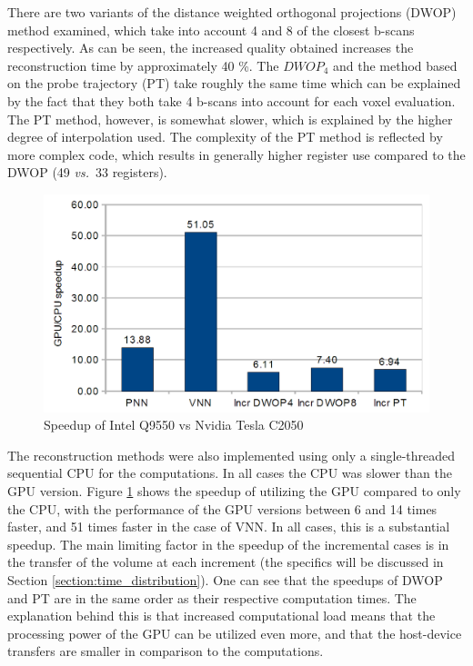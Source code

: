 	There are two variants of the distance weighted orthogonal projections (DWOP) method examined, which take into account 4 and 8 of the closest b-scans respectively. As can be seen, the increased quality obtained increases the reconstruction time by approximately 40 \%. The $DWOP_4$ and the method based on the probe trajectory (PT) take roughly the same time which can be explained by the fact that they both take 4 b-scans into account for each voxel evaluation. The PT method, however, is somewhat slower, which is explained by the higher degree of interpolation used. The complexity of the PT method is reflected by more complex code, which results in generally higher register use compared to the DWOP (49 \textit{vs.}\ 33 registers).
	
	\begin{figure}[h]
	\centering
	\includegraphics[width=\textwidth]{charts/gpu_cpu_speedup.png}
	\caption{Speedup of Intel Q9550 vs Nvidia Tesla C2050}
	\label{fig:gpu_cpu_speedup}
	\end{figure}
	
	The reconstruction methods were also implemented using only a single-threaded sequential CPU for the computations. In all cases the CPU was slower than the GPU version. Figure \ref{fig:gpu_cpu_speedup} shows the speedup of utilizing the GPU compared to only the CPU, with the performance of the GPU versions between 6 and 14 times faster, and 51 times faster in the case of VNN. In all cases, this is a substantial speedup. The main limiting factor in the speedup of the incremental cases is in the transfer of the volume at each increment (the specifics will be discussed in Section \ref{section:time_distribution}). One can see that the speedups of DWOP and PT are in the same order as their respective computation times. The explanation behind this is that increased computational load means that the processing power of the GPU can be utilized even more, and that the host-device transfers are smaller in comparison to the computations.
	
